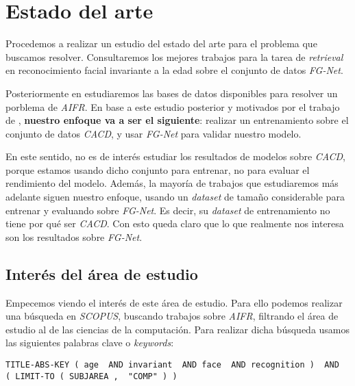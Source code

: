 \chapter{Estado del arte} \label{ich:estado_arte}

Procedemos a realizar un estudio del estado del arte para el problema que buscamos resolver. Consultaremos los mejores trabajos para la tarea de \textit{retrieval} en reconocimiento facial invariante a la edad sobre el conjunto de datos \textit{FG-Net}.

Posteriormente en  estudiaremos las bases de datos disponibles para resolver un porblema de \textit{AIFR}. En base a este estudio posterior y motivados por el trabajo de \cite{informatica:best_fgnet_model}, \textbf{nuestro enfoque va a ser el siguiente}: realizar un entrenamiento sobre el conjunto de datos \textit{CACD}, y usar \textit{FG-Net} para validar nuestro modelo.

En este sentido, no es de interés estudiar los resultados de modelos sobre \textit{CACD}, porque estamos usando dicho conjunto para entrenar, no para evaluar el rendimiento del modelo. Además, la mayoría de trabajos que estudiaremos más adelante siguen nuestro enfoque, usando un \textit{dataset} de tamaño considerable para entrenar y evaluando sobre \textit{FG-Net}. Es decir, su \textit{dataset} de entrenamiento no tiene por qué ser \textit{CACD}. Con esto queda claro que lo que realmente nos interesa son los resultados sobre \textit{FG-Net}.

\section{Interés del área de estudio} \label{isec:interesareaestudio}

Empecemos viendo el interés de este área de estudio. Para ello podemos realizar una búsqueda en \textit{SCOPUS}, buscando trabajos sobre \textit{AIFR}, filtrando el área de estudio al de las ciencias de la computación. Para realizar dicha búsqueda usamos las siguientes palabras clave o \textit{keywords}:

\begin{lstlisting}[caption=\textit{Keywords usadas para la búsqueda en \textit{SCOPUS}. Búsqueda realizada el 17 de Septiembre de 2023}, label=code:scopus_search, captionpos=b]
    TITLE-ABS-KEY ( age  AND invariant  AND face  AND recognition )  AND  ( LIMIT-TO ( SUBJAREA ,  "COMP" ) )
\end{lstlisting}

